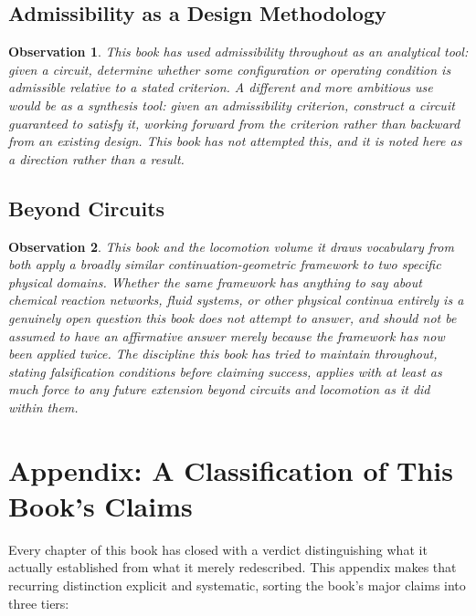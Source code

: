 \documentclass[12pt]{article}
\newtheorem{observation}{Observation}
\begin{document}
\subsection{Admissibility as a Design Methodology}

\begin{observation}
This book has used admissibility throughout as an analytical tool: given a circuit, determine whether some configuration or operating condition is admissible relative to a stated criterion. A different and more ambitious use would be as a synthesis tool: given an admissibility criterion, construct a circuit guaranteed to satisfy it, working forward from the criterion rather than backward from an existing design. This book has not attempted this, and it is noted here as a direction rather than a result.
\end{observation}

\subsection{Beyond Circuits}

\begin{observation}
This book and the locomotion volume it draws vocabulary from both apply a broadly similar continuation-geometric framework to two specific physical domains. Whether the same framework has anything to say about chemical reaction networks, fluid systems, or other physical continua entirely is a genuinely open question this book does not attempt to answer, and should not be assumed to have an affirmative answer merely because the framework has now been applied twice. The discipline this book has tried to maintain throughout, stating falsification conditions before claiming success, applies with at least as much force to any future extension beyond circuits and locomotion as it did within them.
\end{observation}

\section*{Appendix: A Classification of This Book's Claims}

Every chapter of this book has closed with a verdict distinguishing what it actually established from what it merely redescribed. This appendix makes that recurring distinction explicit and systematic, sorting the book's major claims into three tiers:
\end{document}
